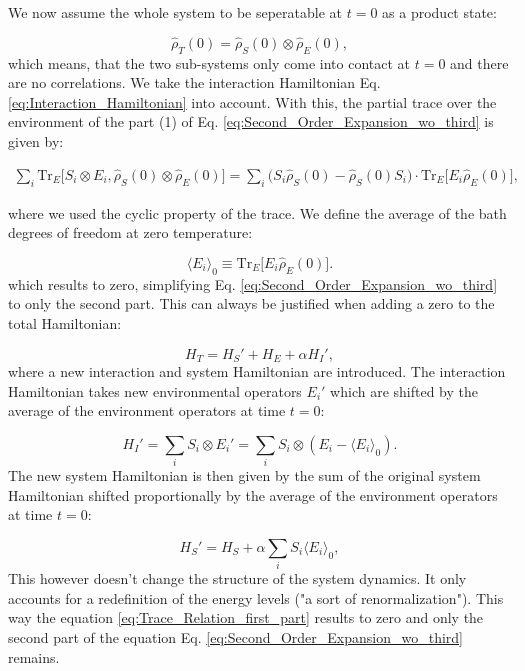 We now assume the whole system to be seperatable at $ t = 0 $ as a product state:

\begin{equation}
	\hat{\rho}_T(0) = \hat{\rho}_S(0) \otimes \hat{\rho}_E(0),
	\label{eq:Initial_Product_State}
\end{equation}
which means, that the two sub-systems only come into contact at $ t = 0 $ and there are no correlations.
We take the interaction Hamiltonian Eq. \eqref{eq:Interaction_Hamiltonian} into account.
With this, the partial trace over the environment of the part (1) of Eq. \eqref{eq:Second_Order_Expansion_wo_third} is given by:

\begin{align}
	\sum_i \mathrm{Tr}_E\big[ S_i \otimes E_i , \hat{\rho}_S(0) \otimes \hat{\rho}_E(0)\big]
	= \sum_i \big(S_i \hat{\rho}_S(0) - \hat{\rho}_S(0) S_i\big) \cdot \mathrm{Tr}_E \big[E_i \hat{\rho}_E(0)\big],
	\label{eq:Trace_Relation_first_part}
\end{align}

where we used the cyclic property of the trace.
We define the average of the bath degrees of freedom at zero temperature:

\begin{equation}
	\langle E_i \rangle_0 \equiv \mathrm{Tr}_E \big[E_i \hat{\rho}_E(0)\big].
	\label{eq:Environment_Expectation_Value}
\end{equation}
which results to zero, simplifying Eq. \eqref{eq:Second_Order_Expansion_wo_third} to only the second part.
This can always be justified when adding a zero to the total Hamiltonian:

\begin{equation}
	H_T = H_S' + H_E + \alpha H_I',
	\label{eq:Shifted_Total_Hamiltonian}
\end{equation}
where a new interaction and system Hamiltonian are introduced.
The interaction Hamiltonian takes new environmental operators $E_i'$ which are shifted by the average of the environment operators at time $t = 0$:

\begin{equation}
	H_I' = \sum_i S_i \otimes E_i' = \sum_i S_i \otimes (E_i - \langle E_i \rangle_0).
	\label{eq:Shifted_Interaction_Hamiltonian}
\end{equation}
The new system Hamiltonian is then given by the sum of the original system Hamiltonian shifted proportionally by the average of the environment operators at time $t = 0$:

\begin{equation}
	H_S' = H_S + \alpha \sum_i S_i \langle E_i \rangle_0,
	\label{eq:Shifted_System_Hamiltonian}
\end{equation}
This however doesn't change the structure of the system dynamics.
It only accounts for a redefinition of the energy levels ("a sort of renormalization").
This way the equation \eqref{eq:Trace_Relation_first_part} results to zero and only the second part of the equation Eq. \eqref{eq:Second_Order_Expansion_wo_third} remains.

